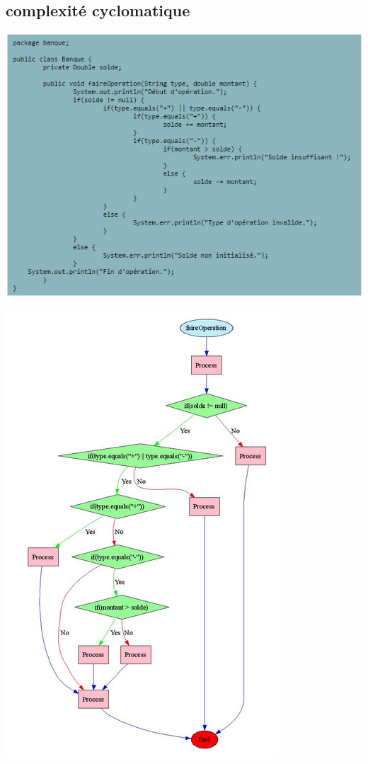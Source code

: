 \documentclass[french]{beamer}%
\begin{document}
		\subsection{complexité cyclomatique}
		
			\begin{frame}
				\begin{center}
					\includegraphics[scale=0.4]{cycloCode}
				\end{center}
			\end{frame}
		
			\begin{frame}
				\begin{center}
					\includegraphics[scale=0.3]{cycloGraph}
				\end{center}
			\end{frame}
			
\end{document}
